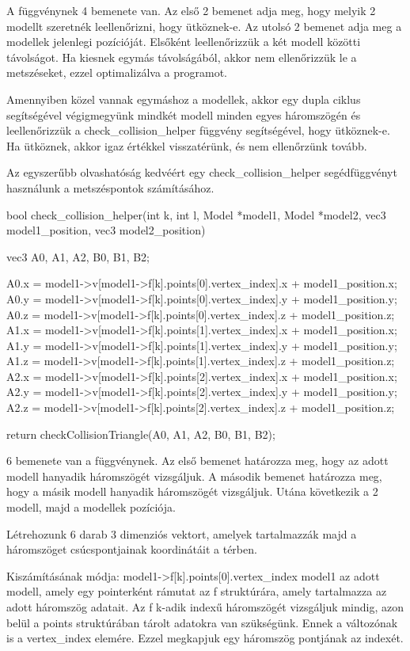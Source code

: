 A függvénynek 4 bemenete van. Az első 2 bemenet adja meg, hogy melyik 2 modellt szeretnék leellenőrizni, hogy ütköznek-e. Az utolsó 2 bemenet adja meg a modellek jelenlegi pozícióját.
Elsőként leellenőrizzük a két modell közötti távolságot. Ha kiesnek egymás távolságából, akkor nem ellenőrizzük le a metszéseket, ezzel optimalizálva a programot. 

Amennyiben közel vannak egymáshoz a modellek, akkor egy dupla ciklus segítségével végigmegyünk mindkét modell minden egyes háromszögén és leellenőrizzük a check\_collision\_helper függvény segítségével, hogy ütköznek-e. Ha ütköznek, akkor igaz értékkel visszatérünk, és nem ellenőrzünk tovább.
\newpage

Az egyszerűbb olvashatóság kedvéért egy check\_collision\_helper segédfüggvényt használunk a metszéspontok számításához.

\begin{cpp}
bool check_collision_helper(int k, int l, Model *model1, 
Model *model2, vec3 model1_position, vec3 model2_position)
{
    vec3 A0, A1, A2, B0, B1, B2;
		
    A0.x = model1->v[model1->f[k].points[0].vertex_index].x 
    + model1_position.x;
    A0.y = model1->v[model1->f[k].points[0].vertex_index].y 
    + model1_position.y;
    A0.z = model1->v[model1->f[k].points[0].vertex_index].z 
    + model1_position.z;
    A1.x = model1->v[model1->f[k].points[1].vertex_index].x 
    + model1_position.x;
    A1.y = model1->v[model1->f[k].points[1].vertex_index].y 
    + model1_position.y;
    A1.z = model1->v[model1->f[k].points[1].vertex_index].z 
    + model1_position.z;
    A2.x = model1->v[model1->f[k].points[2].vertex_index].x 
    + model1_position.x;
    A2.y = model1->v[model1->f[k].points[2].vertex_index].y 
    + model1_position.y;
    A2.z = model1->v[model1->f[k].points[2].vertex_index].z 
    + model1_position.z;

    return checkCollisionTriangle(A0, A1, A2, B0, B1, B2);
}
\end{cpp}

6 bemenete van a függvénynek. Az első bemenet határozza meg, hogy az adott modell hanyadik háromszögét vizsgáljuk. A második bemenet határozza meg, hogy a másik modell hanyadik háromszögét vizsgáljuk. Utána következik a 2 modell, majd a modellek pozíciója.

Létrehozunk 6 darab 3 dimenziós vektort, amelyek tartalmazzák majd a háromszöget csúcspontjainak koordinátáit a térben. 

Kiszámításának módja: model1->f[k].points[0].vertex\_index 
model1 az adott modell, amely egy pointerként rámutat az f struktúrára, amely tartalmazza az adott háromszög adatait. Az f k-adik indexű háromszögét vizsgáljuk mindig, azon belül a points struktúrában tárolt adatokra van szükségünk. Ennek a változónak is a vertex\_index elemére. Ezzel megkapjuk egy háromszög pontjának az indexét.

